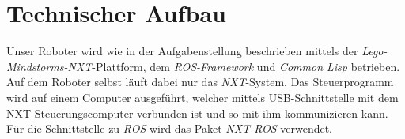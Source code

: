 \documentclass{fetch-my-doc}
\begin{document}
	\section{Technischer Aufbau}\label{sec:Aufbau}
    Unser Roboter wird wie in der Aufgabenstellung beschrieben mittels der \textit{Lego-Mindstorms-NXT}-Plattform, dem \textit{ROS-Framework} und \textit{Common Lisp} betrieben. Auf dem Roboter selbst läuft dabei nur das \textit{NXT}-System. Das Steuerprogramm wird auf einem Computer ausgeführt, welcher mittels USB-Schnittstelle mit dem NXT-Steuerungscomputer verbunden ist und so mit ihm kommunizieren kann. Für die Schnittstelle zu \textit{ROS} wird das Paket \textit{NXT-ROS} verwendet.
    
   
\end{document}
